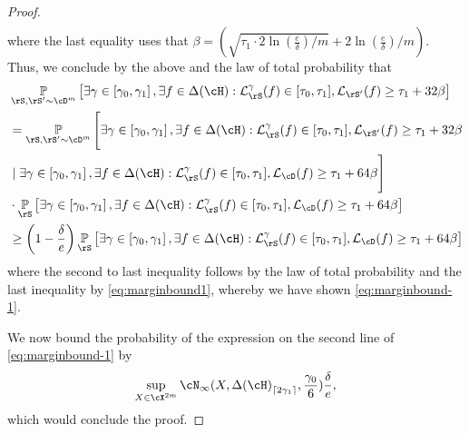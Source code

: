 \begin{proof}
\begin{align}
   \end{align} 
where the last equality uses that $ \beta=\left(\sqrt{\tau_{1}\cdot 2 \ln{\left(\frac{e}{\delta} \right)}/m} +2\ln{\left(\frac{e}{\delta} \right)}/m\right)$.
   Thus, we conclude by the above and the law of total probability that 
\begin{align}\label{eq:marginbound16}
    &\p_{\rS,\rS'\sim\cD^{m}}\left[\exists \gamma \in \left[\gamma_{0},\gamma_{1}\right],\exists f\in \dlh: \ls_{\rS}^{\gamma}(f)\in [\tau_{0},\tau_{1}] ,\ls_{\rS'}(f) \geq \tau_{1} + 32\beta\right]
    \\
    &=
    \p_{\rS,\rS'\sim\cD^{m}} \Bigg[\exists \gamma \in \left[\gamma_{0},\gamma_{1}\right], \exists f\in \dlh: \ls_{\rS}^{\gamma}(f)\in [\tau_{0},\tau_{1}] ,\ls_{\rS'}(f) \geq \tau_{1} 
     +32\beta\nonumber
    \\
    &\mid \exists \gamma \in \left[\gamma_{0},\gamma_{1}\right],\exists f \in \dlh: \ls_{\rS}^{\gamma}(f)\in [\tau_{0},\tau_{1}] ,\ls_{\cD}(f) \geq \tau_{1}  +\cc\beta\Bigg]\nonumber 
    \\
    &\cdot
    \p_{\rS}\left[
        \exists \gamma \in \left[\gamma_{0},\gamma_{1}\right],
        \exists f \in \dlh:
     \ls_{\rS}^{\gamma}(f)\in [\tau_{0},\tau_{1}] ,\ls_{\cD}(f) \geq \tau_{1} +\cc\beta\right] \nonumber
    \\
    &\geq
     \left(1-\frac{\delta}{e}\right) \p_{\rS}\left[
    \exists \gamma \in \left[\gamma_{0},\gamma_{1}\right],
     \exists f \in \dlh: 
     \ls_{\rS}^{\gamma}(f)\in [\tau_{0},\tau_{1}] ,\ls_{\cD}(f) \geq \tau_{1} +\cc\beta\right] 
     \nonumber
   \end{align}
where the second to last inequality follows by the law of total probability and the last inequality by \cref{eq:marginbound1}, 
whereby we have shown \cref{eq:marginbound-1}.

We now bound the probability of the expression on the second line of
\cref{eq:marginbound-1}  by
\[
   \sup_{X\in \cX^{2m}}
   \cN_{\infty}(X,\dlh_{\left\lceil2\gamma_{1}\right\rceil},\frac{\gamma_{0}}{6})\frac{\delta}{e},
 \]
 which would conclude the proof.


\end{proof}
